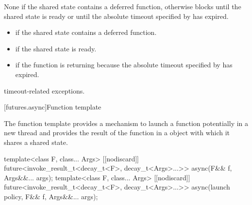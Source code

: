 \begin{itemdescr}
\pnum
{}%
\effects
None if the shared state contains a deferred function,
otherwise
blocks until the shared state is ready or until the
absolute timeout specified by
 has expired.

\pnum
\returns

\begin{itemize}
\item {} if the shared state contains a deferred
function.

\item {} if the shared state is ready.

\item {} if the function is returning because the
absolute timeout
specified by  has expired.
\end{itemize}

\pnum
\throws
timeout-related exceptions.
\end{itemdescr}

[futures.async]{Function template }

\pnum
The function template  provides a mechanism to launch a function potentially
in a new thread and provides the result of the function in a  object with which
it shares a shared state.

%
\begin{itemdecl}
template<class F, class... Args>
  [[nodiscard]] future<invoke_result_t<decay_t<F>, decay_t<Args>...>>
    async(F&& f, Args&&... args);
template<class F, class... Args>
  [[nodiscard]] future<invoke_result_t<decay_t<F>, decay_t<Args>...>>
    async(launch policy, F&& f, Args&&... args);
\end{itemdecl}

